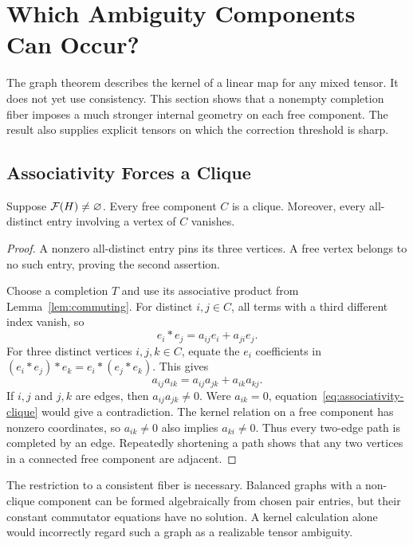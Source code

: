 \section{Which Ambiguity Components Can Occur?}\label{sec:cauchy}
The graph theorem describes the kernel of a linear map for any mixed tensor. It does not yet use consistency. This section shows that a nonempty completion fiber imposes a much stronger internal geometry on each free component. The result also supplies explicit tensors on which the correction threshold is sharp.

\subsection{Associativity Forces a Clique}
\begin{lemma}\label{lem:clique}
Suppose $\mathcal F(H)\ne\varnothing$. Every free component $C$ is a clique. Moreover, every all-distinct entry involving a vertex of $C$ vanishes.
\end{lemma}
\begin{proof}
A nonzero all-distinct entry pins its three vertices. A free vertex belongs to no such entry, proving the second assertion.

Choose a completion $T$ and use its associative product from Lemma~\ref{lem:commuting}. For distinct $i,j\in C$, all terms with a third different index vanish, so
\begin{equation}\label{eq:two-product}
 e_i*e_j=a_{ij}e_i+a_{ji}e_j.
\end{equation}
For three distinct vertices $i,j,k\in C$, equate the $e_i$ coefficients in $(e_i*e_j)*e_k=e_i*(e_j*e_k)$. This gives
\begin{equation}\label{eq:associativity-clique}
 a_{ij}a_{ik}=a_{ij}a_{jk}+a_{ik}a_{kj}.
\end{equation}
If $i,j$ and $j,k$ are edges, then $a_{ij}a_{jk}\ne0$. Were $a_{ik}=0$, equation~\eqref{eq:associativity-clique} would give a contradiction. The kernel relation on a free component has nonzero coordinates, so $a_{ik}\ne0$ also implies $a_{ki}\ne0$. Thus every two-edge path is completed by an edge. Repeatedly shortening a path shows that any two vertices in a connected free component are adjacent.
\end{proof}

The restriction to a consistent fiber is necessary. Balanced graphs with a non-clique component can be formed algebraically from chosen pair entries, but their constant commutator equations have no solution. A kernel calculation alone would incorrectly regard such a graph as a realizable tensor ambiguity.

